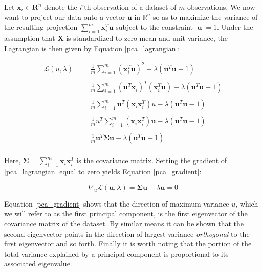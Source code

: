 \documentclass[11pt, oneside, a4paper]{report}
\begin{document}
Let $\boldsymbol{x}_i \in \mathbf{R}^n$ denote the $i$'th observation of a dataset
of $m$ observations. We now want to project our data onto a vector $\boldsymbol{u}$
in $\mathbb{R}^n$ so as to maximize the variance of the resulting
projection $\sum_{i=1}^m \boldsymbol{x}_i^T \boldsymbol{u}$ subject to the constraint
$|\boldsymbol{u}|=1$. Under the assumption that $\boldsymbol{X}$ is
standardized to zero mean and unit variance, the Lagrangian is then
given by Equation \ref{pca_lagrangian}:


  \begin{equation}
    \label{pca_lagrangian}
    \begin{array}{lcl}
      \mathcal{L}(u,\lambda) & = & \frac{1}{m} \sum_{i=1}^m (\boldsymbol{x}_i^T \boldsymbol{u})^2 - \lambda (\boldsymbol{u}^T \boldsymbol{u} -1) \\
      \\& = & \frac{1}{m} \sum_{i=1}^m (\boldsymbol{u}^T \boldsymbol{x}_i)^T(\boldsymbol{x}_i^T \boldsymbol{u}) - \lambda (\boldsymbol{u}^T \boldsymbol{u} -1) \\
      \\& = & \frac{1}{m} \sum_{i=1}^m \boldsymbol{u}^T(\boldsymbol{x}_i \boldsymbol{x}_i^T)u - \lambda (\boldsymbol{u}^T \boldsymbol{u} -1) \\
      \\& = & \frac{1}{m}  u^T\sum_{i=1}^m(\boldsymbol{x}_i \boldsymbol{x}_i^T)\boldsymbol{u} - \lambda (\boldsymbol{u}^T \boldsymbol{u} -1) \\
      \\& = & \frac{1}{m} \boldsymbol{u}^T \boldsymbol{\Sigma} \boldsymbol{u} - \lambda (\boldsymbol{u}^T \boldsymbol{u} -1) \\
    \end{array}
  \end{equation}

Here, $\boldsymbol{\Sigma} = \sum_{i = 1}^m \boldsymbol{x}_i
\boldsymbol{x}_i^T$ is the covariance matrix. Setting the gradient of
\ref{pca_lagrangian} equal to zero yields Equation \ref{pca_gradient}:


\begin{equation}
  \label{pca_gradient}
  \nabla_u \mathcal{L}(\boldsymbol{u}, \lambda) = \boldsymbol{\Sigma} \boldsymbol{u} - \lambda \boldsymbol{u} = 0
\end{equation}

Equation \ref{pca_gradient} shows that the direction of maximum
variance $u$, which we will refer to as the first principal component,
is the first eigenvector of the covariance matrix of the dataset. By
similar means it can be shown that the second eigenvector points in
the direction of largest variance \emph{orthogonal} to the first
eigenvector and so forth. Finally it is worth noting that the portion
of the total variance explained by a principal component is
proportional to its associated eigenvalue.
\end{document}
